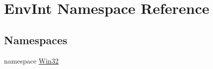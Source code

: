 \hypertarget{namespace_env_int}{}\section{Env\+Int Namespace Reference}
\label{namespace_env_int}
\subsection*{Namespaces}
\begin{DoxyCompactItemize}
\item 
namespace \hyperlink{namespace_env_int_1_1_win32}{Win32}
\end{DoxyCompactItemize}
